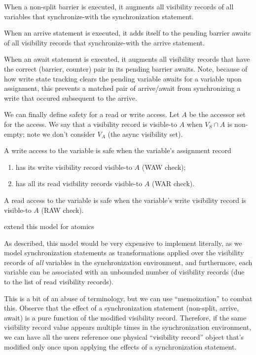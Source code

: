 \filbreak
When a non-split barrier is executed, it augments all visibility records of all variables that synchronize-with the synchronization statement.

\filbreak
When an arrive statement is executed, it adds itself to the pending barrier awaits of all visibility records that synchronize-with the arrive statement.

\filbreak
When an await statement is executed, it augments all visibility records that have the correct (barrier, counter) pair in its pending barrier awaits.
Note, because of how write state tracking clears the pending variable awaits for a variable upon assignment, this prevents a matched pair of arrive/await from synchronizing a write that occured subsequent to the arrive.

\filbreak
{} We can finally define safety for a read or write access.
Let $A$ be the accessor set for the access.
We say that a visibility record is visible-to $A$ when ${V_S \cap A}$ is non-empty; note we don't consider $V_A$ (the async visibility set).

A write access to the variable is safe when the variable's assignment record
\begin{enumerate}
  \item has its write visibility record visible-to $A$ (WAW check);
  \item has all its read visibility records visible-to $A$ (WAR check).
\end{enumerate}
A read access to the variable is safe when the variable's write visibility record is visible-to $A$ (RAW check).

 extend this model for atomics

\filbreak
{}

 As described, this model would be very expensive to implement literally, as we model synchronization statements as transformations applied over the visibility records of \textit{all} variables in the synchronization environment, and furthermore, each variable can be associated with an unbounded number of visibility records (due to the list of read visibility records).

\filbreak
This is a bit of an abuse of terminology, but we can use ``memoization'' to combat this.
Observe that the effect of a synchronization statement (non-split, arrive, await) is a pure function of the modified visibility record.
Therefore, if the same visibility record value appears multiple times in the synchronization environment, we can have all the users reference one physical ``visibility record'' object that's modified only once upon applying the effects of a synchronization statement.

